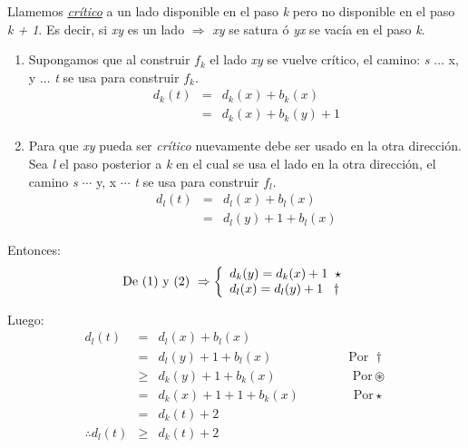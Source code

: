\documentclass[12pt,a4paper]{report}
\begin{document}
			\par Llamemos \textit{\underline{crítico}} a un lado disponible en el paso \textit{k} pero no disponible en el paso \textit{k + 1}. Es decir, si \textit{xy} es un lado $\Rightarrow$ \textit{xy} se satura ó \textit{yx} se vacía en el paso \textit{k}.
			\begin{enumerate}
				\item Supongamos que al construir $f_{k}$ el lado \textit{xy} se vuelve crítico, el camino: \textit{s} $\dotsc$ x, y $\dotsc$ \textit{t} se usa para construir $f_{k}$.
				\begin{eqnarray}
					\nonumber d_{k}(\textit{t}) &=& d_{k}(x) + b_{k}(x) \\
					\nonumber &=& d_{k}(x) + b_{k}(y) + 1
				\end{eqnarray}

				\item Para que \textit{xy} pueda ser \textit{crítico} nuevamente debe ser usado en la otra dirección. Sea \textit{l} el paso posterior a \textit{k} en el cual se usa el lado en la otra dirección, el camino \textit{s} $\dotsb$ y, x $\dotsb$ \textit{t} se usa para construir $f_{l}$.
				\begin{eqnarray}
					\nonumber d_{l}(t) &=& d_{l}(x) + b_{l}(x) \\
					\nonumber &=& d_{l}(y) + 1 + b_{l}(x)
				\end{eqnarray}
			\end{enumerate}

			\par Entonces:
			\begin{equation*}
				\textup{De (1) y (2) } \Rightarrow
	  		\left \lbrace
	  		\begin{array}{l}
					d_{k}(y) = d_{k}(x) + 1 \; \; \star \\
	    		d_{l}(x) = d_{l}(y) + 1 \; \; \; \dag
	  		\end{array}
	  		\right.
			\end{equation*}

			\par Luego:
			\begin{eqnarray}
				\nonumber d_{l}(t) &=& d_{l}(x) + b_{l}(x) \\
				\nonumber &=& d_{l}(y) + 1 + b_{l}(x) \qquad\qquad\qquad\text{Por } \dag \\
				\nonumber & \geq & d_{k}(y) + 1 + b_{k}(x) \qquad\qquad\qquad\text{Por} \circledast \\
				\nonumber &=& d_{k}(x) + 1 + 1 + b_{k}(x) \;\qquad\qquad\text{Por} \star \\
				\nonumber &=& d_{k}(\textit{t}) + 2 \\
				\nonumber \therefore d_{l}(\textit{t}) & \geq & d_{k}(\textit{t}) + 2
			\end{eqnarray}
\end{document}
